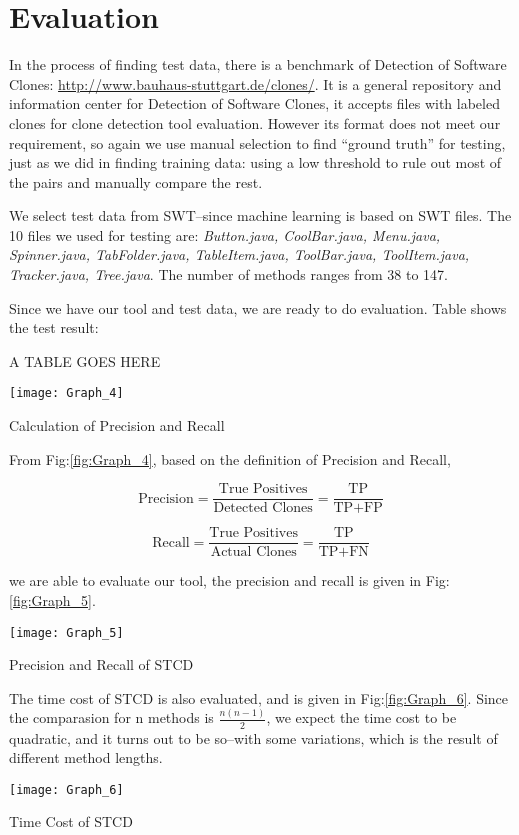 \documentclass[../main.tex]{subfiles}
\begin{document}
\section{Evaluation}

In the process of finding test data, there is a benchmark of Detection of Software Clones: {\color{blue} \url{http://www.bauhaus-stuttgart.de/clones/}}. It is a general repository and information center for Detection of Software Clones, it accepts files with labeled clones for clone detection tool evaluation. However its format does not meet our requirement, so again we use manual selection to find ``ground truth'' for testing, just as we did in finding training data: using a low threshold to rule out most of the pairs and manually compare the rest.

We select test data from SWT--since machine learning is based on SWT files. The 10 files we used for testing are: \textit{Button.java, CoolBar.java, Menu.java, Spinner.java, TabFolder.java, TableItem.java, ToolBar.java, ToolItem.java, Tracker.java, Tree.java}. The number of methods ranges from 38 to 147.

Since we have our tool and test data, we are ready to do evaluation. Table shows the test result:

A TABLE GOES HERE

\begin{figurehere}
\centering \texttt{[image: Graph\_4]} 
\caption{Calculation of Precision and Recall} \label{fig:Graph_4}
\end{figurehere}

From Fig:\ref{fig:Graph_4}, based on the definition of Precision and Recall, 

\begin{equation}
\text{Precision} = \frac{ \text{True Positives}} {\text{Detected Clones}} = \frac{ \text{TP}} {\text{TP} + \text{FP}}
\end{equation}

\begin{equation}
\text{Recall} = \frac{ \text{True Positives}} {\text{Actual Clones}} = \frac{ \text{TP}} {\text{TP} + \text{FN}}
\end{equation}

we are able to evaluate our tool, the precision and recall is given in Fig:\ref{fig:Graph_5}.

\begin{figurehere}
\centering \texttt{[image: Graph\_5]} 
\caption{Precision and Recall of STCD} \label{fig:Graph_5}
\end{figurehere}

The time cost of STCD is also evaluated, and is given in Fig:\ref{fig:Graph_6}. Since the comparasion for n methods is $\frac{n(n-1)}{2}$, we expect the time cost to be quadratic, and it turns out to be so--with some variations, which is the result of different method lengths.

\begin{figurehere}
\centering \texttt{[image: Graph\_6]} 
\caption{Time Cost of STCD} \label{fig:Graph_6}
\end{figurehere}
\end{document}
